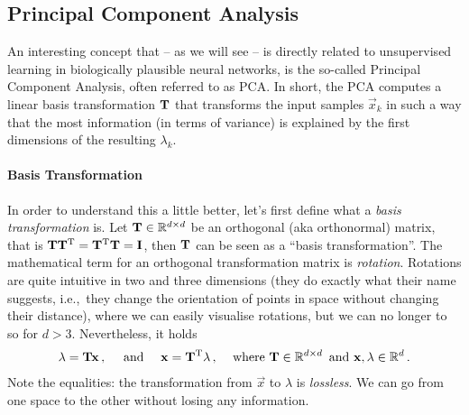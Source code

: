 \documentclass[10pt,letterpaper,oneside]{article}
\begin{document}
\subsection{Principal Component Analysis}

An interesting concept that -- as we will see -- is directly related to unsupervised learning in biologically plausible neural networks, is the so-called Principal Component Analysis, often referred to as PCA. In short, the PCA computes a linear basis transformation ${\mathbf{T}}$ that transforms the input samples $\vec x_k$ in such a way that the most information (in terms of variance) is explained by the first dimensions of the resulting $\lambda_k$.

\paragraph{Basis Transformation}
In order to understand this a little better, let's first define what a \emph{basis transformation} is. Let ${\mathbf{T}} \in \mathbb{R}^{d \times d}$ be an orthogonal (aka orthonormal) matrix, that is ${\mathbf{T}} {\mathbf{T}}^{\mathrm{T}} = {\mathbf{T}}^{\mathrm{T}} {\mathbf{T}} = {\mathbf{I}}$, then ${\mathbf{T}}$ can be seen as a \enquote{basis transformation}. The mathematical term for an orthogonal transformation matrix is \emph{rotation}. Rotations are quite intuitive in two and three dimensions (they do exactly what their name suggests, i.e.,~they change the orientation of points in space without changing their distance), where we can easily visualise rotations, but we can no longer to so for $d > 3$. Nevertheless, it holds
\begin{align*}
	{\mathbf{\lambda}} = {\mathbf{T}} {\mathbf{x}} \,, \quad \text{ and }\quad {\mathbf{x}} = {\mathbf{T}}^{\mathrm{T}} {\mathbf{\lambda}} \,, && \text{ where } {\mathbf{T}} \in \mathbb{R}^{d \times d} \, \text{ and } {\mathbf{x}}, {\mathbf{\lambda}} \in \mathbb{R}^d \,.
\end{align*}
Note the equalities: the transformation from $\vec x$ to $\lambda$ is \emph{lossless}. We can go from one space to the other without losing any information.

\end{document}
